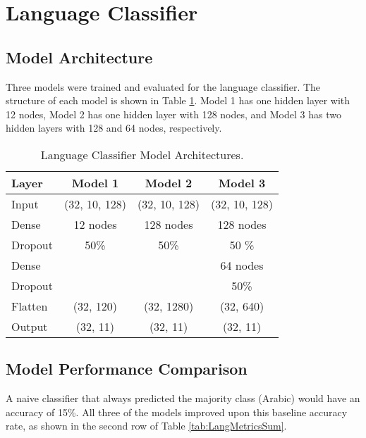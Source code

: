 \documentclass[11pt, letterpaper]{article}
\begin{document}
\section{Language Classifier}
\subsection{Model Architecture}

Three models were trained and evaluated for the language classifier. The structure of each model is shown in Table \ref{tab:LangModels}.  Model 1 has one hidden layer with 12 nodes, Model 2 has one hidden layer with 128 nodes, and Model 3 has two hidden layers with 128 and 64 nodes, respectively.

\begin{table}[!h]
\begin{center}
\caption{Language Classifier Model Architectures. }
\begin{tabular}{l | c |c  | c |}

Layer  & Model 1 & Model 2 & Model 3\\
\hline

Input 	& (32, 10, 128)& (32, 10, 128) & (32, 10, 128) \\ \hline

Dense	& 12 nodes 	& 128 nodes 	& 128 nodes \\
Dropout	& 50\%		& 50\%		& 50 \% \\ \hline

Dense	&			&			& 64 nodes \\
Dropout	&			& 			& 50\% \\ \hline

Flatten 	& (32, 120)	& (32, 1280)	& (32, 640) \\ \hline
Output 	& (32, 11)		& (32, 11)		& (32, 11)\\
\hline
\end{tabular}

\label{tab:LangModels}
\end{center}
\end{table}

\subsection{Model Performance Comparison}

A naive classifier that always predicted the majority class (Arabic) would have an accuracy of 15\%.  All three of the models improved upon this baseline accuracy rate, as shown in the second row of Table \ref{tab:LangMetricsSum}. 
\end{document}
